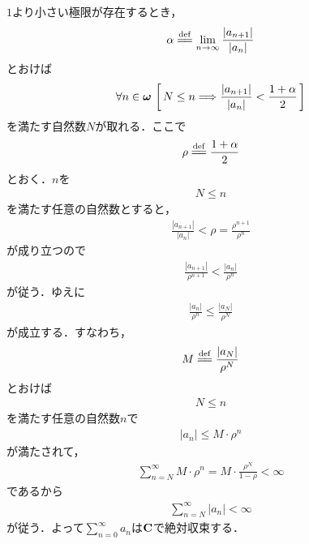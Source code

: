 	\begin{sketch}
		$1$より小さい極限が存在するとき，
		\begin{align}
			\alpha \defeq \lim_{n \to \infty} \frac{|a_{n+1}|}{|a_n|}
		\end{align}
		とおけば
		\begin{align}
			\forall n \in {\boldsymbol \omega}\, 
			\left[\, N \leq n \Longrightarrow \frac{|a_{n+1}|}{|a_n|} < \frac{1+\alpha}{2}\, \right]
		\end{align}
		を満たす自然数$N$が取れる．ここで
		\begin{align}
			\rho \defeq \frac{1+\alpha}{2}
		\end{align}
		とおく．$n$を
		\begin{align}
			N \leq n
		\end{align}
		を満たす任意の自然数とすると，
		\begin{align}
			\frac{|a_{n+1}|}{|a_n|} < \rho = \frac{\rho^{n+1}}{\rho^n}
		\end{align}
		が成り立つので
		\begin{align}
			\frac{|a_{n+1}|}{\rho^{n+1}} < \frac{|a_n|}{\rho^n}
		\end{align}
		が従う．ゆえに
		\begin{align}
			\frac{|a_n|}{\rho^n} \leq \frac{|a_N|}{\rho^N}
		\end{align}
		が成立する．すなわち，
		\begin{align}
			M \defeq \frac{|a_N|}{\rho^N}
		\end{align}
		とおけば
		\begin{align}
			N \leq n
		\end{align}
		を満たす任意の自然数$n$で
		\begin{align}
			|a_n| \leq M \cdot \rho^n
		\end{align}
		が満たされて，
		\begin{align}
			\sum_{n=N}^\infty M \cdot \rho^n = M \cdot \frac{\rho^N}{1-\rho} < \infty
		\end{align}
		であるから
		\begin{align}
			\sum_{n=N}^\infty |a_n| < \infty
		\end{align}
		が従う．よって$\sum_{n=0}^\infty a_n$は$\mathbf{C}$で絶対収束する．
		\QED
	\end{sketch}
	
	\begin{comment}
	\begin{screen}
		\begin{thm}[Cauchyの冪根判定法]
			$a$を複素数列とする．このとき
			\begin{align}
				\inf{n \in \Natural}{\sup{\substack{k \in \Natural \\ n < k}}{\sqrt[k]{|a_k|}}} < 1
				\label{fom:Cauchy_root_test_1}
			\end{align}
			ならば$\sum_{n=0}^\infty a_n$は$\C$で絶対収束する．
		\end{thm}
	\end{screen}
	
	\begin{sketch}
		
	\end{sketch}
	\end{comment}
	
